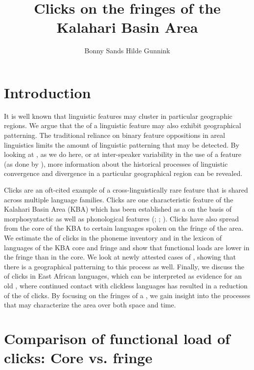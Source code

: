 \documentclass[output=paper
,newtxmath
,modfonts
,nonflat]{langsci/langscibook}
\title{Clicks on the fringes of the Kalahari Basin Area}
\author{Bonny Sands\affiliation{Northern Arizona University} \lastand Hilde Gunnink\affiliation{Ghent University}}
\begin{document}
\maketitle

\section{Introduction}\label{sec:sands:1}

It is well known that linguistic features may cluster in particular geographic regions. We argue that the  of a linguistic feature may also exhibit geographical patterning. The traditional reliance on binary feature oppositions in areal linguistics limits the amount of linguistic patterning that may be detected. By looking at , as we do here, or at inter-speaker variability in the use of a feature (as done by \citealt{Kulkarni-Joshi2016}), more information about the historical processes of linguistic convergence and divergence in a particular geographical region can be revealed. 

Clicks are an oft-cited example of a cross-linguistically rare feature that is shared across multiple language families. Clicks are one characteristic feature of the Kalahari Basin Area (KBA) which has been established as a  on the basis of morphosyntactic as well as phonological features (\citealt{Güldemann1998}; \citeyear{güldemann2013}; \citealt{naumann2015}). Clicks have also spread from the core of the KBA to certain languages spoken on the fringe of the area. We estimate the  of clicks in the phoneme inventory and in the lexicon of languages of the KBA core and fringe and show that functional loads are lower in the fringe than in the core. We look at newly attested cases of , showing that there is a geographical patterning to this process as well. Finally, we discuss the  of clicks in East African languages, which can be interpreted as evidence for an old , where continued contact with clickless languages has resulted in a reduction of the  of clicks. By focusing on the fringes of a , we gain insight into the processes that may characterize the area over both space and time. 

\section{Comparison of functional load of clicks: Core vs. fringe}\label{sec:sands:2}
\end{document}

